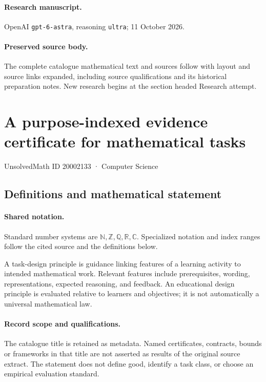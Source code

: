 \documentclass[11pt]{article}
\begin{document}
\paragraph{Research manuscript.} OpenAI \texttt{gpt-6-astra}, reasoning \texttt{ultra}; 11 October 2026.
\paragraph{Preserved source body.} The complete catalogue mathematical text and sources follow with layout and source links expanded, including source qualifications and its historical preparation notes. New research begins at the section headed Research attempt.

\section{A purpose-indexed evidence certificate for mathematical tasks}\label{20002133}
{\small UnsolvedMath ID 20002133 · Computer Science}
\subsection{Definitions and mathematical statement}

\paragraph{Shared notation.}Standard number systems are $\mathbb N,\mathbb Z,\mathbb Q,\mathbb R,\mathbb C$. Specialized notation and index ranges follow the cited source and the definitions below.


A task-design principle is guidance linking features of a learning activity to intended mathematical work. Relevant features include prerequisites, wording, representations, expected reasoning, and feedback. An educational design principle is evaluated relative to learners and objectives; it is not automatically a universal mathematical law.
\paragraph{Record scope and qualifications.}
The catalogue title is retained as metadata. Named certificates, contracts, bounds or frameworks in that title are not asserted as results of the original source extract.
The statement does not define good, identify a task class, or choose an empirical evaluation standard.
\end{document}
